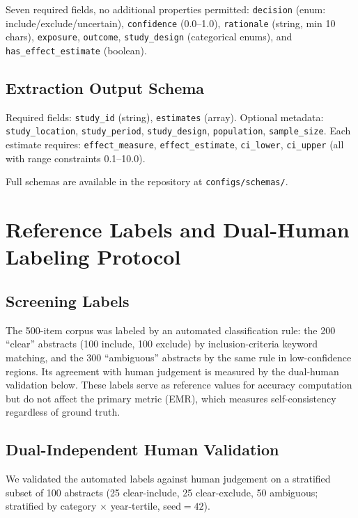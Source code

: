 \documentclass[11pt]{article}
\begin{document}
Seven required fields, no additional properties permitted:
\texttt{decision} (enum: include/exclude/uncertain),
\texttt{confidence} (0.0--1.0),
\texttt{rationale} (string, min 10 chars),
\texttt{exposure}, \texttt{outcome}, \texttt{study\_design} (categorical enums),
and \texttt{has\_effect\_estimate} (boolean).

\subsection{Extraction Output Schema}

Required fields: \texttt{study\_id} (string), \texttt{estimates} (array).
Optional metadata: \texttt{study\_location}, \texttt{study\_period}, \texttt{study\_design}, \texttt{population}, \texttt{sample\_size}.
Each estimate requires: \texttt{effect\_measure}, \texttt{effect\_estimate}, \texttt{ci\_lower}, \texttt{ci\_upper} (all with range constraints 0.1--10.0).

Full schemas are available in the repository at \texttt{configs/schemas/}.

\section{Reference Labels and Dual-Human Labeling Protocol}
\label{sec:labeling}

\subsection{Screening Labels}

The 500-item corpus was labeled by an automated classification rule: the 200 ``clear'' abstracts (100 include, 100 exclude) by inclusion-criteria keyword matching, and the 300 ``ambiguous'' abstracts by the same rule in low-confidence regions.
Its agreement with human judgement is measured by the dual-human validation below.
These labels serve as reference values for accuracy computation but do not affect the primary metric (EMR), which measures self-consistency regardless of ground truth.

\subsection{Dual-Independent Human Validation}
\label{sec:dualhuman}

We validated the automated labels against human judgement on a stratified subset of 100 abstracts (25 clear-include, 25 clear-exclude, 50 ambiguous; stratified by category $\times$ year-tertile, seed${=}42$).
\end{document}
